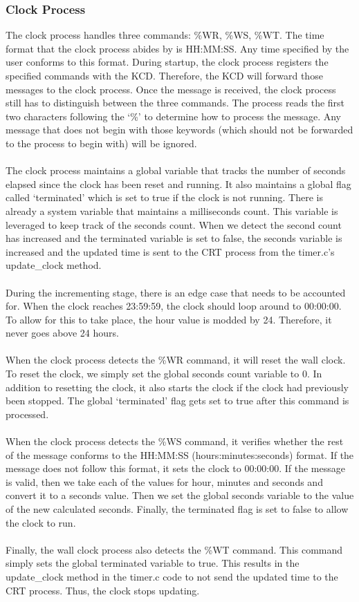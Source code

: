 \documentclass[12pt]{article}
\begin{document}
\subsubsection{Clock Process}
The clock process handles three commands: \%WR, \%WS, \%WT. The time format that the clock process abides by is HH:MM:SS. Any time specified by the user conforms to this format. During startup, the clock process registers the specified commands with the KCD. Therefore, the KCD will forward those messages to the clock process. Once the message is received, the clock process still has to distinguish between the three commands. The process reads the first two characters following the ‘\%’ to determine how to process the message. Any message that does not begin with those keywords (which should not be forwarded to the process to begin with) will be ignored. \\ \\
The clock process maintains a global variable that tracks the number of seconds elapsed since the clock has been reset and running. It also maintains a global flag called ‘terminated’ which is set to true if the clock is not running. There is already a system variable that maintains a milliseconds count. This variable is leveraged to keep track of the seconds count. When we detect the second count has increased and the terminated variable is set to false, the seconds variable is increased and the updated time is sent to the CRT process from the timer.c’s update\_clock method. \\ \\
During the incrementing stage, there is an edge case that needs to be accounted for. When the clock reaches 23:59:59, the clock should loop around to 00:00:00. To allow for this to take place, the hour value is modded by 24. Therefore, it never goes above 24 hours.\\ \\
When the clock process detects the \%WR command, it will reset the wall clock. To reset the clock, we simply set the global seconds count variable to 0. In addition to resetting the clock, it also starts the clock if the clock had previously been stopped. The global ‘terminated’ flag gets set to true after this command is processed. \\ \\
When the clock process detects the \%WS command, it verifies whether the rest of the message conforms to the HH:MM:SS (hours:minutes:seconds) format. If the message does not follow this format, it sets the clock to 00:00:00. If the message is valid, then we take each of the values for hour, minutes and seconds and convert it to a seconds value. Then we set the global seconds variable to the value of the new calculated seconds. Finally, the terminated flag is set to false to allow the clock to run. \\ \\
Finally, the wall clock process also detects the \%WT command. This command simply sets the global terminated variable to true. This results in the update\_clock method in the timer.c code to not send the updated time to the CRT process. Thus, the clock stops updating.
\end{document}
